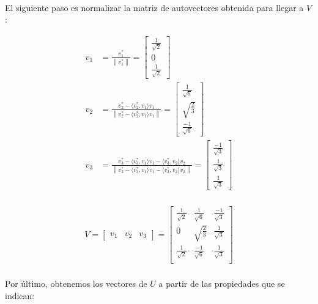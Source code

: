 \documentclass[a4paper, spanish]{article}
\newcommand{\norm}[1]{\left\lVert#1\right\rVert}
\begin{document}
  \paragraph{}
  El siguiente paso es normalizar la matriz de autovectores obtenida para llegar a $V$:

  \begin{align}
    v_1 &= \frac{v_1^*}{\norm{v_1^*}} =
    \begin{bmatrix}
      \frac{1}{\sqrt{2}} \\
      0 \\
      \frac{1}{\sqrt{2}}
    \end{bmatrix} \\
    v_2 &= \frac{v_2^* - \langle v_2^*,v_1 \rangle v_1}{\norm{v_2^* - \langle v_2^*,v_1 \rangle v_1}} =
    \begin{bmatrix}
      \frac{1}{\sqrt{6}} \\
      \sqrt{\frac{2}{3}} \\
      \frac{-1}{\sqrt{6}}
    \end{bmatrix} \\
    v_3 &= \frac{v_3^* - \langle v_3^*,v_1 \rangle v_1 - \langle v_3^*,v_2 \rangle v_2}{\norm{v_3^* - \langle v_3^*,v_1 \rangle v_1 - \langle v_3^*,v_2 \rangle v_2}} =
    \begin{bmatrix}
      \frac{-1}{\sqrt{3}} \\
      \frac{1}{\sqrt{3}} \\
      \frac{1}{\sqrt{3}}
    \end{bmatrix} \\
  \end{align}

  \begin{align}
    V =
    \begin{bmatrix}
      v_1 & v_2 & v_3
    \end{bmatrix} =
    \begin{bmatrix}
      \frac{1}{\sqrt{2}} & \frac{1}{\sqrt{6}} & \frac{-1}{\sqrt{3}} \\
      0 & \sqrt{\frac{2}{3}} &\frac{1}{\sqrt{3}} \\
      \frac{1}{\sqrt{2}} & \frac{-1}{\sqrt{6}} & \frac{1}{\sqrt{3}} \\
    \end{bmatrix}
  \end{align}

  \paragraph{}
  Por último, obtenemos los vectores de $U$ a partir de las propiedades que se indican:
\end{document}
